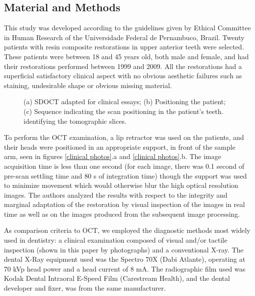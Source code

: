 \documentclass[12pt,twoside,english]{book}
\renewcommand{\~}{\perispomeni}%
\DeclareRobustCommand{\textgreek}[1]{\leavevmode{\greektext #1}}
\numberwithin{equation}{section}
\numberwithin{figure}{section}
\begin{document}
\subsection{Material and Methods}

This study was developed according to the guidelines given by Ethical Committee in Human Research of the Universidade Federal de Pernambuco, Brazil. Twenty patients with resin composite restorations in upper anterior teeth were selected. These patients were between 18 and 45 years old, both male and female, and had their restorations performed between 1999 and 2009. All the restorations had a superficial satisfactory clinical aspect with no obvious aesthetic failures such as staining, undesirable shape or obvious missing material.
\begin{figure}[h]
\caption{(a) SDOCT adapted for clinical essays; (b) Positioning the patient; (c) Sequence indicating the scan positioning in the patient's teeth. identifying the tomographic slices.\label{fig:clinical photos}}
\end{figure}
 
To perform the OCT examination, a lip retractor was used on the patients, and their heads were positioned in an appropriate support, in front of the sample arm, seen in figures \ref{clinical photos}.a and \ref{clinical photos}.b. The image acquisition time is less than one second (for each image, there was 0.1 second of pre-scan settling time and 80 \textgreek{m}s of integration time) though the support was used to minimize movement which would otherwise blur the high optical resolution images. The authors analyzed the results with respect to the integrity and marginal adaptation of the restoration by visual inspection of the images in real time as well as on the images produced from the subsequent image processing.

As comparison criteria to OCT, we employed the diagnostic methods most widely used in dentistry: a clinical examination composed of visual and/or tactile inspection (shown in this paper by photographs) and a conventional X-ray. The dental X-Ray equipment used was the Spectro 70X (Dabi Atlante), operating at 70 kVp head power and a head current of 8 mA. The radiographic film used was Kodak Dental Intraoral E-Speed Film (Carestream Health), and the dental developer and fixer, was from the same manufacturer.
\end{document}
